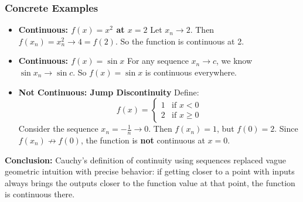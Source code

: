\subsubsection{Concrete Examples}

\begin{itemize}
    \item \textbf{Continuous: \( f(x) = x^2 \) at \( x = 2 \)}  
    Let \( x_n \to 2 \). Then \( f(x_n) = x_n^2 \to 4 = f(2) \). So the function is continuous at 2.

    \item \textbf{Continuous: \( f(x) = \sin x \)}  
    For any sequence \( x_n \to c \), we know \( \sin x_n \to \sin c \). So \( f(x) = \sin x \) is continuous everywhere.

    \item \textbf{Not Continuous: Jump Discontinuity}  
    Define:
    \[
    f(x) = \begin{cases}
      1 & \text{if } x < 0 \\
      2 & \text{if } x \geq 0
    \end{cases}
    \]
    Consider the sequence \( x_n = -\frac{1}{n} \to 0 \). Then \( f(x_n) = 1 \), but \( f(0) = 2 \). Since \( f(x_n) \not\to f(0) \), the function is \textbf{not} continuous at \( x = 0 \).
\end{itemize}

\bigskip

\textbf{Conclusion:} Cauchy’s definition of continuity using sequences replaced vague geometric intuition with precise behavior: if getting closer to a point with inputs always brings the outputs closer to the function value at that point, the function is continuous there.


